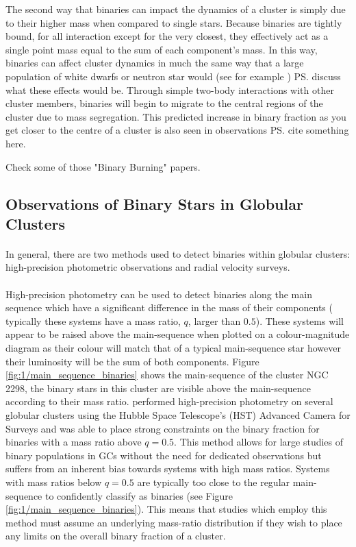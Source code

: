 The second way that binaries can impact the dynamics of a cluster is simply due to their higher mass
when compared to single stars. Because binaries are tightly bound, for all interaction except for
the very closest, they effectively act as a single point mass equal to the sum of each component's
mass. In this way, binaries can affect cluster dynamics in much the same way that a large population
of white dwarfs or neutron star would (see for example \citet{Kremer2021}) \ps{discuss what these
	effects would be}. Through simple two-body interactions with other cluster members, binaries will
begin to migrate to the central regions of the cluster due to mass segregation. This predicted
increase in binary fraction as you get closer to the centre of a cluster is also seen in
observations \ps{cite something here}.

Check some of those "Binary Burning" papers.

\subsection{Observations of Binary Stars in Globular Clusters}

\paragraph{}
In general, there are two methods used to detect binaries within globular clusters: high-precision
photometric observations and radial velocity surveys.

\paragraph{}
High-precision photometry can be used to detect binaries along the main sequence which have a
significant difference in the mass of their components ( typically these systems have a mass ratio,
$q$, larger than $0.5$). These systems will appear to be raised above the main-sequence when plotted
on a colour-magnitude diagram as their colour will match that of a typical main-sequence star
however their luminosity will be the sum of both components. Figure
\ref{fig:1/main_sequence_binaries} shows the main-sequence of the cluster NGC 2298, the binary stars
in this cluster are visible above the main-sequence according to their mass ratio.
\citet{Milone2012} performed high-precision photometry on several globular clusters using the Hubble
Space Telescope's (HST) Advanced Camera for Surveys and was able to place strong constraints on the
binary fraction for binaries with a mass ratio above $q=0.5$. This method allows for large studies
of binary populations in GCs without the need for dedicated observations but suffers from an
inherent bias towards systems with high mass ratios. Systems with mass ratios below $q=0.5$ are
typically too close to the regular main-sequence to confidently classify as binaries (see Figure
\ref{fig:1/main_sequence_binaries}). This means that studies which employ this method must assume an
underlying mass-ratio distribution if they wish to place any limits on the overall binary fraction
of a cluster.


